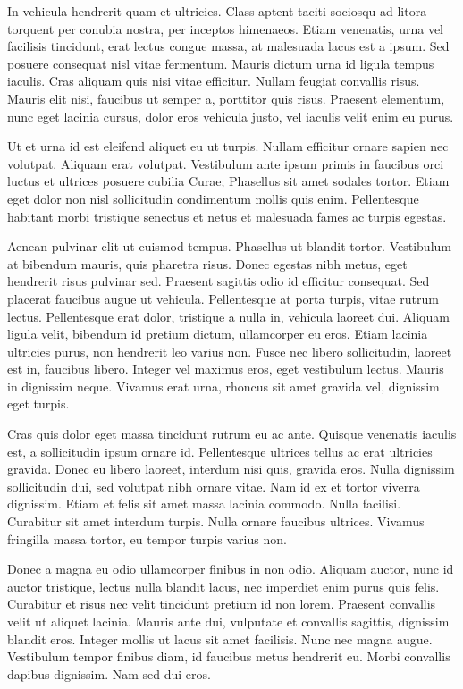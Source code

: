 \documentclass{novel}
\begin{document}
In vehicula hendrerit quam et ultricies. Class aptent taciti sociosqu ad litora torquent per conubia nostra, per inceptos himenaeos. Etiam venenatis, urna vel facilisis tincidunt, erat lectus congue massa, at malesuada lacus est a ipsum. Sed posuere consequat nisl vitae fermentum. Mauris dictum urna id ligula tempus iaculis. Cras aliquam quis nisi vitae efficitur. Nullam feugiat convallis risus. Mauris elit nisi, faucibus ut semper a, porttitor quis risus. Praesent elementum, nunc eget lacinia cursus, dolor eros vehicula justo, vel iaculis velit enim eu purus.

Ut et urna id est eleifend aliquet eu ut turpis. Nullam efficitur ornare sapien nec volutpat. Aliquam erat volutpat. Vestibulum ante ipsum primis in faucibus orci luctus et ultrices posuere cubilia Curae; Phasellus sit amet sodales tortor. Etiam eget dolor non nisl sollicitudin condimentum mollis quis enim. Pellentesque habitant morbi tristique senectus et netus et malesuada fames ac turpis egestas.

Aenean pulvinar elit ut euismod tempus. Phasellus ut blandit tortor. Vestibulum at bibendum mauris, quis pharetra risus. Donec egestas nibh metus, eget hendrerit risus pulvinar sed. Praesent sagittis odio id efficitur consequat. Sed placerat faucibus augue ut vehicula. Pellentesque at porta turpis, vitae rutrum lectus. Pellentesque erat dolor, tristique a nulla in, vehicula laoreet dui. Aliquam ligula velit, bibendum id pretium dictum, ullamcorper eu eros. Etiam lacinia ultricies purus, non hendrerit leo varius non. Fusce nec libero sollicitudin, laoreet est in, faucibus libero. Integer vel maximus eros, eget vestibulum lectus. Mauris in dignissim neque. Vivamus erat urna, rhoncus sit amet gravida vel, dignissim eget turpis.

Cras quis dolor eget massa tincidunt rutrum eu ac ante. Quisque venenatis iaculis est, a sollicitudin ipsum ornare id. Pellentesque ultrices tellus ac erat ultricies gravida. Donec eu libero laoreet, interdum nisi quis, gravida eros. Nulla dignissim sollicitudin dui, sed volutpat nibh ornare vitae. Nam id ex et tortor viverra dignissim. Etiam et felis sit amet massa lacinia commodo. Nulla facilisi. Curabitur sit amet interdum turpis. Nulla ornare faucibus ultrices. Vivamus fringilla massa tortor, eu tempor turpis varius non.

Donec a magna eu odio ullamcorper finibus in non odio. Aliquam auctor, nunc id auctor tristique, lectus nulla blandit lacus, nec imperdiet enim purus quis felis. Curabitur et risus nec velit tincidunt pretium id non lorem. Praesent convallis velit ut aliquet lacinia. Mauris ante dui, vulputate et convallis sagittis, dignissim blandit eros. Integer mollis ut lacus sit amet facilisis. Nunc nec magna augue. Vestibulum tempor finibus diam, id faucibus metus hendrerit eu. Morbi convallis dapibus dignissim. Nam sed dui eros.
\end{document}
